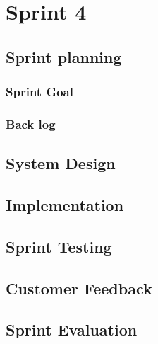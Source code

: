 \chapter{Sprint 4}


\section{Sprint planning}

\subsection{Sprint Goal}

\subsection{Back log}


\section{System Design}


\section{Implementation}


\section{Sprint Testing}


\section{Customer Feedback}


\section{Sprint Evaluation}


